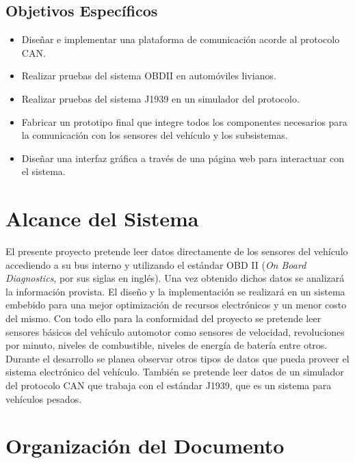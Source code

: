 \subsection{Objetivos Específicos}

\begin{itemize}
	\item Diseñar e implementar una plataforma de comunicación acorde al protocolo CAN. 

	\item Realizar pruebas del sistema OBDII en automóviles livianos.
	
	\item Realizar pruebas del sistema  J1939 en un simulador del protocolo.
	
	\item Fabricar un prototipo final que integre todos los componentes necesarios para la comunicación con los sensores del vehículo y los subsistemas.
	
	\item Diseñar una interfaz gráfica a través de una página web para interactuar con el sistema.
		
\end{itemize}

\section{Alcance del Sistema}
 El presente proyecto pretende leer datos directamente de los sensores del vehículo accediendo a su bus interno y utilizando el estándar OBD II (\textit{On Board Diagnostics}, por sus siglas en inglés). 
 Una vez obtenido dichos datos se analizará la información provista.  
 El diseño y la implementación se realizará en un sistema embebido para una mejor optimización de recursos electrónicos y un menor costo del mismo. 
 Con todo ello para la conformidad del proyecto se pretende leer sensores básicos del vehículo automotor como sensores de velocidad, revoluciones por minuto, niveles de combustible, niveles de energía de batería entre otros. 
 Durante el desarrollo se planea observar otros tipos de datos que pueda proveer el sistema electrónico del vehículo. 
 También se pretende leer datos de un simulador del protocolo CAN que trabaja con el estándar J1939, que es un sistema para vehículos pesados. 
 
 
\section{Organización del Documento}


